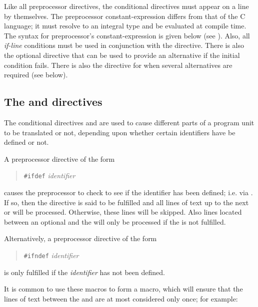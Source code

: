 Like all preprocessor directives, the conditional directives must
appear on a line by themselves. The preprocessor constant-expression
differs from that of the C language; it must resolve to an integral
type and be evaluated at compile time. The syntax
for preprocessor's constant-expression is given below (see
). Also, all {\it if-line} conditions must 
be used in conjunction with the 
directive. There is also the optional
 directive that
can be used to provide an alternative if the initial condition
fails. There is also the
 directive for when several alternatives are required (see below). 

\subsection{The  and  directives}  

The conditional directives  and
 are used to cause different parts of a
program unit to be translated or not, depending upon whether certain
identifiers have be defined or not.


A preprocessor directive of the form 

\begin{quote}
{\tt\#ifdef} {\it identifier} 
\end{quote} 

	causes the preprocessor to check to see if the identifier has been defined;
	i.e. via  .  If so, then the directive is said to
	be fulfilled and all lines of text up to the next  	 or  	 
	will be processed.  Otherwise,
	these lines  will be skipped.  Also lines located between
	an optional  and the  will only be
	processed if the  is not fulfilled.  


	Alternatively,
	a preprocessor directive of the form 
	\begin{quote} 
	{\tt \#ifndef} {\it identifier} 
	\end{quote} 
	is only fulfilled if the {\it identifier} has not been defined.
	
	It is common to use these macros to form a macro, which will
	ensure that the lines of text between the  and 
	are at most considered only once; for example:

